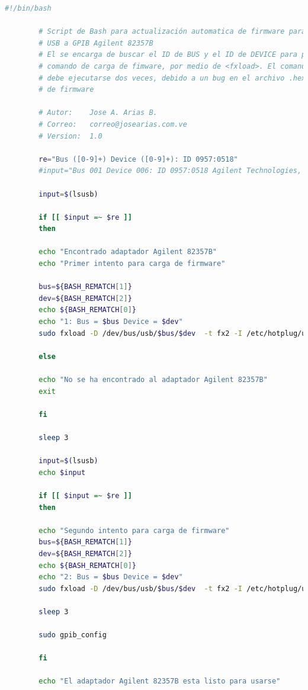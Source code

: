\documentclass[paper=letter,oneside,fontsize=11pt, parskip=full]{scrartcl}
\begin{document}
	\begin{lstlisting}[language=bash,caption={bash version}]
		#!/bin/bash 
		
		# Script de Bash para actualización automatica de firmware para el adaptador
		# USB a GPIB Agilent 82357B
		# El se encarga de buscar el ID de BUS y el ID de DEVICE para preparar el
		# comando de carga de fimware, por medio de <fxload>. El comando de carga 
		# debe ejecutarse dos veces, debido a un bug en el archivo .hex de codigo 
		# de firmware
		
		# Autor: 	Jose A. Arias B.
		# Correo: 	correo@josearias.com.ve
		# Version:	1.0
		
		re="Bus ([0-9]+) Device ([0-9]+): ID 0957:0518"
		#input="Bus 001 Device 006: ID 0957:0518 Agilent Technologies, Inc. "
		
		input=$(lsusb)
		
		if [[ $input =~ $re ]] 
		then 
		
		echo "Encontrado adaptador Agilent 82357B"
		echo "Primer intento para carga de firmware"
		
		bus=${BASH_REMATCH[1]}
		dev=${BASH_REMATCH[2]}
		echo ${BASH_REMATCH[0]}
		echo "1: Bus = $bus Device = $dev"
		sudo fxload -D /dev/bus/usb/$bus/$dev  -t fx2 -I /etc/hotplug/usb/agilent_82357a/measat_releaseX1.8.hex
		
		else 
		
		echo "No se ha encontrado al adaptador Agilent 82357B"
		exit
		
		fi
		
		sleep 3
		
		input=$(lsusb)
		echo $input
		
		if [[ $input =~ $re ]]
		then
		
		echo "Segundo intento para carga de firmware"
		bus=${BASH_REMATCH[1]}
		dev=${BASH_REMATCH[2]}
		echo ${BASH_REMATCH[0]}
		echo "2: Bus = $bus Device = $dev"
		sudo fxload -D /dev/bus/usb/$bus/$dev  -t fx2 -I /etc/hotplug/usb/agilent_82357a/measat_releaseX1.8.hex
		
		sleep 3
		
		sudo gpib_config
		
		fi
		
		echo "El adaptador Agilent 82357B esta listo para usarse"
	\end{lstlisting}	
		
\end{document}
